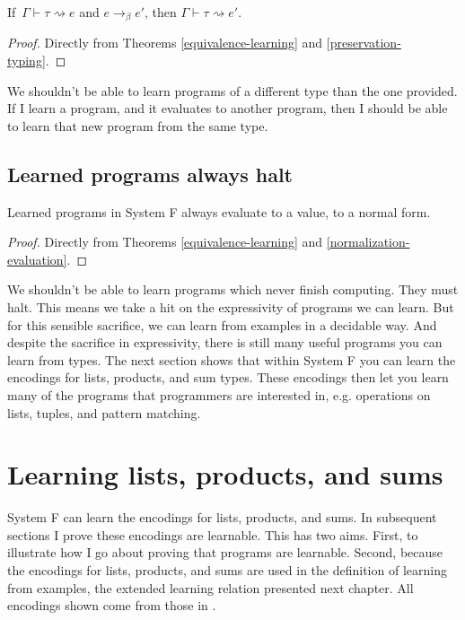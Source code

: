 \begin{corollary}
If $\,\Gamma \vdash \tau \rightsquigarrow e$ and $e \to_\beta e'$, then $\Gamma \vdash \tau \rightsquigarrow e'$.
\label{preservation-learning}
\end{corollary}
\begin{proof}
Directly from Theorems \ref{equivalence-learning} and \ref{preservation-typing}. 
\end{proof}
\vspace*{-1.2em}

We shouldn't be able to learn programs of a different type than the one provided. If I learn a program, and it evaluates to another program, then I should be able to learn that new program from the same type.

\subsection{Learned programs always halt}

\begin{corollary}
Learned programs in System F always evaluate to a value, to a normal form.
\label{normalization-learning}
\end{corollary}
\begin{proof}
Directly from Theorems \ref{equivalence-learning} and \ref{normalization-evaluation}. 
\end{proof}
\vspace*{-1.2em}

We shouldn't be able to learn programs which never finish computing. They must halt. This means we take a hit on the expressivity of programs we can learn. But for this sensible sacrifice, we can learn from examples in a decidable way. And despite the sacrifice in expressivity, there is still many useful programs you can learn from types. The next section shows that within System F you can learn the encodings for lists, products, and sum types. These encodings then let you learn many of the programs that programmers are interested in, e.g. operations on lists, tuples, and pattern matching.

\section{Learning lists, products, and sums}

System F can learn the encodings for lists, products, and sums. In subsequent sections I prove these encodings are learnable. This has two aims. First, to illustrate how I go about proving that programs are learnable. Second, because the encodings for lists, products, and sums are used in the definition of learning from examples, the extended learning relation presented next chapter. All encodings shown come from those in \cite{girard1989proofs}.

